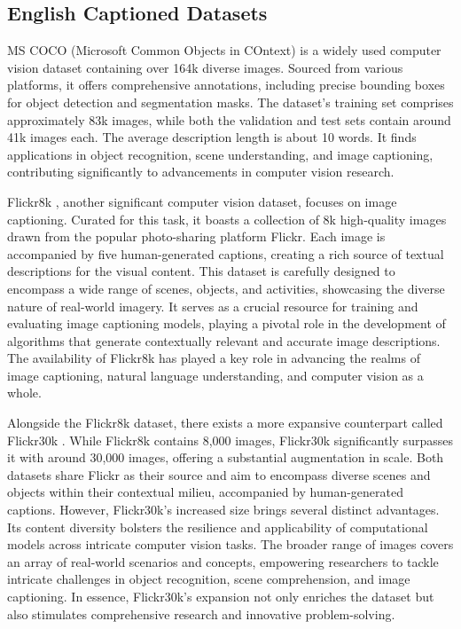 \documentclass[runningheads]{llncs}
\begin{document}
\subsection{English Captioned Datasets}
MS COCO (Microsoft Common Objects in COntext) \cite{MSCOCO} is a widely used computer vision dataset containing over 164k diverse images. Sourced from various platforms, it offers comprehensive annotations, including precise bounding boxes for object detection and segmentation masks. The dataset's training set comprises approximately 83k images, while both the validation and test sets contain around 41k images each. The average description length is about 10 words. It finds applications in object recognition, scene understanding, and image captioning, contributing significantly to advancements in computer vision research.

Flickr8k \cite{Flickr8k}, another significant computer vision dataset, focuses on image captioning. Curated for this task, it boasts a collection of 8k high-quality images drawn from the popular photo-sharing platform Flickr. Each image is accompanied by five human-generated captions, creating a rich source of textual descriptions for the visual content. This dataset is carefully designed to encompass a wide range of scenes, objects, and activities, showcasing the diverse nature of real-world imagery. It serves as a crucial resource for training and evaluating image captioning models, playing a pivotal role in the development of algorithms that generate contextually relevant and accurate image descriptions. The availability of Flickr8k has played a key role in advancing the realms of image captioning, natural language understanding, and computer vision as a whole.

Alongside the Flickr8k dataset, there exists a more expansive counterpart called Flickr30k \cite{Flickr30k}. While Flickr8k contains 8,000 images, Flickr30k significantly surpasses it with around 30,000 images, offering a substantial augmentation in scale. Both datasets share Flickr as their source and aim to encompass diverse scenes and objects within their contextual milieu, accompanied by human-generated captions.
However, Flickr30k's increased size brings several distinct advantages. Its content diversity bolsters the resilience and applicability of computational models across intricate computer vision tasks. The broader range of images covers an array of real-world scenarios and concepts, empowering researchers to tackle intricate challenges in object recognition, scene comprehension, and image captioning. In essence, Flickr30k's expansion not only enriches the dataset but also stimulates comprehensive research and innovative problem-solving.
\end{document}
